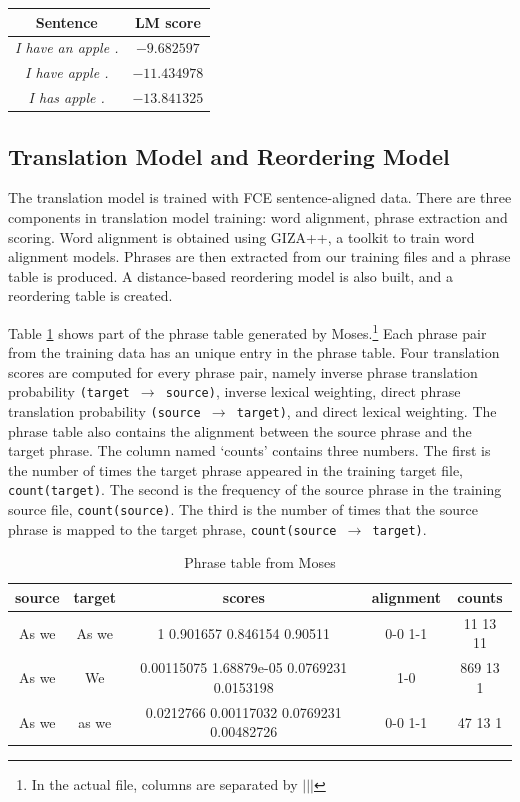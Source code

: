 \documentclass[12pt,a4paper,twoside,openright]{report}
\begin{document}
\begin{center}
\begin{tabular}{ c | c }
 \textbf{Sentence} & \textbf{LM score} \\ 
 \hline
 \textit{I have an apple .} & $-9.682597$ \\ 
 \textit{I have apple .} & $-11.434978$ \\ 
 \textit{I has apple .} & $-13.841325$ 
\end{tabular}
\end{center}

\subsection{Translation Model and Reordering Model}\label{section:moses_tm}
The translation model is trained with FCE sentence-aligned data. There are three components in translation model training: word alignment, phrase extraction and scoring. Word alignment is obtained using GIZA++, a toolkit to train word alignment models. Phrases are then extracted from our training files and a phrase table is produced. A distance-based reordering model is also built, and a reordering table is created. 

Table \ref{table:phrase_table} shows part of the phrase table generated by Moses.\footnote{In the actual file, columns are separated by $\vert\vert\vert$} Each phrase pair from the training data has an unique entry in the phrase table. Four translation scores are computed for every phrase pair, namely inverse phrase translation probability \texttt{(target $\rightarrow$ source)}, inverse lexical weighting, direct phrase translation probability \texttt{(source $\rightarrow$ target)}, and direct lexical weighting. The phrase table also contains the alignment between the source phrase and the target phrase. The column named `counts' contains three numbers. The first is the number of times the target phrase appeared in the training target file, \texttt{count(target)}. The second is the frequency of the source phrase in the training source file, \texttt{count(source)}. The third is the number of times that the source phrase is mapped to the target phrase, \texttt{count(source $\rightarrow$ target)}.

\begin{table}[ht]
\centering
\begin{tabular}{ |c|c|c|c|c| } 
 \hline
 source & target & scores & alignment & counts \\ [0.5ex] 
 \hline
 As we & As we & 1 0.901657 0.846154 0.90511 & 0-0 1-1 & 11 13 11\\
 As we & We & 0.00115075 1.68879e-05 0.0769231 0.0153198 & 1-0 & 869 13 1\\
 As we & as we & 0.0212766 0.00117032 0.0769231 0.00482726 & 0-0 1-1 & 47 13 1\\
 \hline
\end{tabular}
\caption{Phrase table from Moses}
\label{table:phrase_table}
\end{table}
\end{document}
